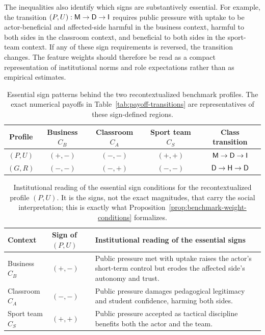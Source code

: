 The inequalities also identify which signs are substantively essential. For example, the transition $(P,U):\mathsf{M}\to\mathsf{D}\to\mathsf{I}$ requires public pressure with uptake to be actor-beneficial and affected-side harmful in the business context, harmful to both sides in the classroom context, and beneficial to both sides in the sport-team context. If any of these sign requirements is reversed, the transition changes. The feature weights should therefore be read as a compact representation of institutional norms and role expectations rather than as empirical estimates.

\begin{table}[t]
\centering
\small
\begin{tabular}{ccccc}
\toprule
Profile & Business $C_B$ & Classroom $C_A$ & Sport team $C_S$ & Class transition\\
\midrule
$(P,U)$ & $(+,-)$ & $(-,-)$ & $(+,+)$ & $\mathsf{M}\to\mathsf{D}\to\mathsf{I}$\\
$(G,R)$ & $(-,-)$ & $(-,+)$ & $(-,-)$ & $\mathsf{D}\to\mathsf{H}\to\mathsf{D}$\\
\bottomrule
\end{tabular}
\caption{Essential sign patterns behind the two recontextualized benchmark profiles. The exact numerical payoffs in Table~\ref{tab:payoff-transitions} are representatives of these sign-defined regions.}
\label{tab:essential-signs}
\end{table}

\begin{table}[t]
\centering
\small
\setlength{\tabcolsep}{4pt}
\begin{tabular}{>{\raggedright\arraybackslash}p{}
                >{\centering\arraybackslash}p{}
                >{\raggedright\arraybackslash}p{}}
\toprule
Context & Sign of $(P,U)$ & Institutional reading of the essential signs\\
\midrule
Business $C_B$ & $(+,-)$ & Public pressure met with uptake raises the actor's short-term control but erodes the affected side's autonomy and trust.\\
Classroom $C_A$ & $(-,-)$ & Public pressure damages pedagogical legitimacy and student confidence, harming both sides.\\
Sport team $C_S$ & $(+,+)$ & Public pressure accepted as tactical discipline benefits both the actor and the team.\\
\bottomrule
\end{tabular}
\caption{Institutional reading of the essential sign conditions for the recontextualized profile $(P,U)$. It is the signs, not the exact magnitudes, that carry the social interpretation; this is exactly what Proposition~\ref{prop:benchmark-weight-conditions} formalizes.}
\label{tab:institutional-signs}
\end{table}

\FloatBarrier
